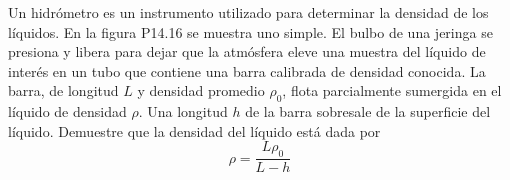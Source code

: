 \item Un hidrómetro es un instrumento utilizado para determinar la densidad de los líquidos. En la figura P14.16 se muestra uno simple. El bulbo de una jeringa se presiona y libera para dejar que la atmósfera eleve una muestra del líquido de interés en un tubo que contiene una barra calibrada de densidad conocida. La barra, de longitud $L$ y densidad promedio $\rho_0$, flota parcialmente sumergida en el líquido de densidad $\rho$. Una longitud $h$ de la barra sobresale de la superficie del líquido. Demuestre que la densidad del líquido está dada por
$$ \rho = \frac{L \rho_0}{L - h} $$
